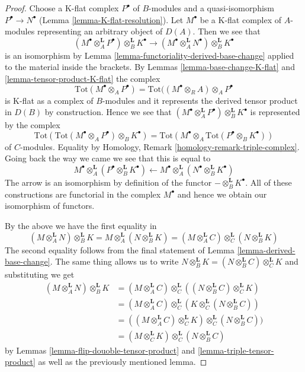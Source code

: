 \documentclass[10pt,a4paper]{amsart}
\theoremstyle{plain}
\theoremstyle{definition}
\theoremstyle{remark}
\numberwithin{equation}{subsection}
\begin{document}
\begin{proof}
Choose a K-flat complex $P^\bullet$ of $B$-modules and a quasi-isomorphism
$P^\bullet \to N^\bullet$ (Lemma \ref{lemma-K-flat-resolution}).
Let $M^\bullet$ be a K-flat complex of $A$-modules representing an
arbitrary object of $D(A)$. Then we see that
$$
(M^\bullet \otimes_A^\mathbf{L} P^\bullet) \otimes_B^\mathbf{L} K^\bullet
\longrightarrow
(M^\bullet \otimes_A^\mathbf{L} N^\bullet) \otimes_B^\mathbf{L} K^\bullet
$$
is an isomorphism by Lemma \ref{lemma-functoriality-derived-base-change}
applied to the material inside the brackets. By
Lemmas \ref{lemma-base-change-K-flat} and \ref{lemma-tensor-product-K-flat}
the complex
$$
\text{Tot}(M^\bullet \otimes_A P^\bullet) =
\text{Tot}((M^\bullet \otimes_R A) \otimes_A P^\bullet
$$
is K-flat as a complex of $B$-modules and it represents
the derived tensor product in $D(B)$ by construction.
Hence we see that
$(M^\bullet \otimes_A^\mathbf{L} P^\bullet) \otimes_B^\mathbf{L} K^\bullet$
is represented by the complex
$$
\text{Tot}(\text{Tot}(M^\bullet \otimes_A P^\bullet)\otimes_B K^\bullet) =
\text{Tot}(M^\bullet \otimes_A \text{Tot}(P^\bullet \otimes_B K^\bullet))
$$
of $C$-modules. Equality by
Homology, Remark \ref{homology-remark-triple-complex}.
Going back the way we came we see that this is equal to
$$
M^\bullet \otimes_A^\mathbf{L} (P^\bullet \otimes_B^\mathbf{L} K^\bullet)
\longleftarrow
M^\bullet \otimes_A^\mathbf{L} (N^\bullet \otimes_B^\mathbf{L} K^\bullet)
$$
The arrow is an isomorphism by definition of the functor
$-\otimes_B^\mathbf{L} K^\bullet$. All of these constructions
are functorial in the complex $M^\bullet$ and hence we obtain
our isomorphism of functors.

\medskip\noindent
By the above we have the first equality in
$$
(M \otimes_A^\mathbf{L} N) \otimes_B^\mathbf{L} K =
M \otimes_A^\mathbf{L} (N \otimes_B^\mathbf{L} K) =
(M \otimes_A^\mathbf{L} C) \otimes_C^\mathbf{L} (N \otimes_B^\mathbf{L} K)
$$
The second equality follows from the final statement of
Lemma \ref{lemma-derived-base-change}.
The same thing allows us to write
$N \otimes_B^\mathbf{L} K = (N \otimes_B^\mathbf{L} C) \otimes_C^\mathbf{L} K$
and substituting we get
\begin{align*}
(M \otimes_A^\mathbf{L} N) \otimes_B^\mathbf{L} K
& =
(M \otimes_A^\mathbf{L} C) \otimes_C^\mathbf{L}
((N \otimes_B^\mathbf{L} C) \otimes_C^\mathbf{L} K) \\
& =
(M \otimes_A^\mathbf{L} C) \otimes_C^\mathbf{L}
(K \otimes_C^\mathbf{L} (N \otimes_B^\mathbf{L} C)) \\
& =
((M \otimes_A^\mathbf{L} C) \otimes_C^\mathbf{L} K)
\otimes_C^\mathbf{L} (N \otimes_B^\mathbf{L} C)) \\
& =
(M \otimes_C^\mathbf{L} K)
\otimes_C^\mathbf{L} (N \otimes_B^\mathbf{L} C)
\end{align*}
by Lemmas \ref{lemma-flip-douoble-tensor-product} and
\ref{lemma-triple-tensor-product}
as well as the previously mentioned lemma.
\end{proof}
\end{document}
